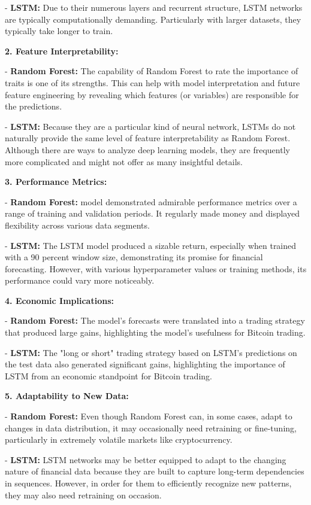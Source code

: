 -	\textbf{LSTM:} Due to their numerous layers and recurrent structure, LSTM networks are typically computationally demanding. Particularly with larger datasets, they typically take longer to train.

\textbf{2.	Feature Interpretability:}

-	\textbf{Random Forest:} The capability of Random Forest to rate the importance of traits is one of its strengths. This can help with model interpretation and future feature engineering by revealing which features (or variables) are responsible for the predictions.

-	\textbf{LSTM:} Because they are a particular kind of neural network, LSTMs do not naturally provide the same level of feature interpretability as Random Forest. Although there are ways to analyze deep learning models, they are frequently more complicated and might not offer as many insightful details.

\textbf{3. Performance Metrics:}

-	\textbf{ Random Forest:} model demonstrated admirable performance metrics over a range of training and validation periods. It regularly made money and displayed flexibility across various data segments.

-	\textbf{LSTM:} The LSTM model produced a sizable return, especially when trained with a 90 percent window size, demonstrating its promise for financial forecasting. However, with various hyperparameter values or training methods, its performance could vary more noticeably.

\textbf{4.	Economic Implications: }

-   \textbf{Random Forest:} The model's forecasts were translated into a trading strategy that produced large gains, highlighting the model's usefulness for Bitcoin trading.

-   \textbf{LSTM:} The "long or short" trading strategy based on LSTM's predictions on the test data also generated significant gains, highlighting the importance of LSTM from an economic standpoint for Bitcoin trading.

\textbf{5.	Adaptability to New Data:}

-	\textbf{Random Forest:} Even though Random Forest can, in some cases, adapt to changes in data distribution, it may occasionally need retraining or fine-tuning, particularly in extremely volatile markets like cryptocurrency.

-	\textbf{LSTM:} LSTM networks may be better equipped to adapt to the changing nature of financial data because they are built to capture long-term dependencies in sequences. However, in order for them to efficiently recognize new patterns, they may also need retraining on occasion.

